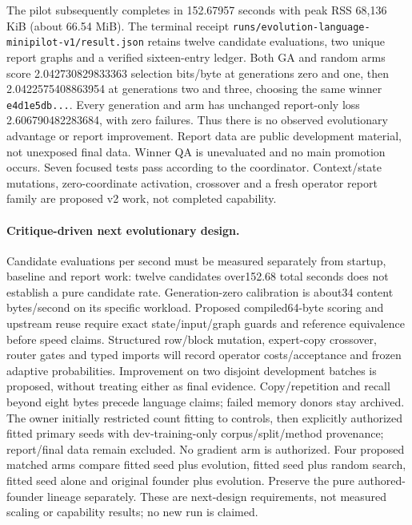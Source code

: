 \documentclass[11pt]{article}
\begin{document}
The pilot subsequently completes in 152.67957 seconds with peak RSS
68{,}136 KiB (about 66.54 MiB). The terminal receipt
\texttt{runs/evolution-language-minipilot-v1/result.json} retains twelve
candidate evaluations, two unique report graphs and a verified sixteen-entry
ledger. Both GA and random arms score 2.042730829833363 selection bits/byte
at generations zero and one, then 2.0422575408863954 at generations two and
three, choosing the same winner \texttt{e4d1e5db...}. Every generation and arm
has unchanged report-only loss 2.606790482283684, with zero failures. Thus there
is no observed evolutionary advantage or report improvement. Report data are
public development material, not unexposed final data. Winner QA is unevaluated
and no main promotion occurs. Seven focused tests pass according to the
coordinator. Context/state mutations, zero-coordinate activation, crossover and
a fresh operator report family are proposed v2 work, not completed capability.

\paragraph{Critique-driven next evolutionary design.}
Candidate evaluations per second must be measured separately from startup,
baseline and report work: twelve candidates over152.68 total seconds does not
establish a pure candidate rate. Generation-zero calibration is about34 content
bytes/second on its specific workload. Proposed compiled64-byte scoring and
upstream reuse require exact state/input/graph guards and reference equivalence
before speed claims. Structured row/block mutation, expert-copy crossover,
router gates and typed imports will record operator costs/acceptance and frozen
adaptive probabilities. Improvement on two disjoint development batches is
proposed, without treating either as final evidence. Copy/repetition and recall
beyond eight bytes precede language claims; failed memory donors stay archived.
The owner initially restricted count fitting to controls, then explicitly
authorized fitted primary seeds with dev-training-only corpus/split/method
provenance; report/final data remain excluded. No gradient arm is authorized.
Four proposed matched arms compare fitted seed plus evolution, fitted seed plus
random search, fitted seed alone and original founder plus evolution. Preserve
the pure authored-founder lineage separately. These are next-design requirements, not measured
scaling or capability results; no new run is claimed.
\end{document}
